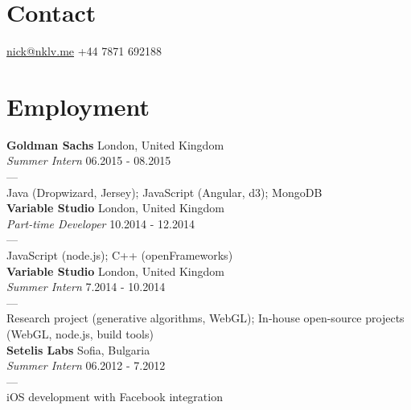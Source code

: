 \documentclass[margin,line,a4paper]{resume}
\begin{document}

\begin{resume}

\section{\mysidestyle Contact}

\hypersetup{urlcolor=RoyalBlue}
\href{mailto:nick@nklv.me}{nick@nklv.me} \hfill +44 7871 692188 \vspace{1mm}

\section{\mysidestyle Employment}

\textbf{Goldman Sachs} \hfill London, United Kingdom \vspace{1mm} \\
\textsl{Summer Intern} \hfill 06.2015 - 08.2015 \vspace{2mm} \\
--- \\
Java (Dropwizard, Jersey); JavaScript (Angular, d3); MongoDB \\

\textbf{Variable Studio} \hfill London, United Kingdom \vspace{1mm} \\
\textsl{Part-time Developer} \hfill 10.2014 - 12.2014 \vspace{2mm} \\
--- \\
JavaScript (node.js); C++ (openFrameworks) \\

\textbf{Variable Studio} \hfill London, United Kingdom \vspace{1mm} \\
\textsl{Summer Intern} \hfill 7.2014 - 10.2014 \vspace{2mm} \\
--- \\
Research project (generative algorithms, WebGL); In-house open-source projects (WebGL, node.js, build tools) \\

\textbf{Setelis Labs} \hfill Sofia, Bulgaria \vspace{1mm} \\
\textsl{Summer Intern} \hfill 06.2012 - 7.2012 \vspace{2mm} \\
--- \\
iOS development with Facebook integration \\


\end{resume}
\end{document}
